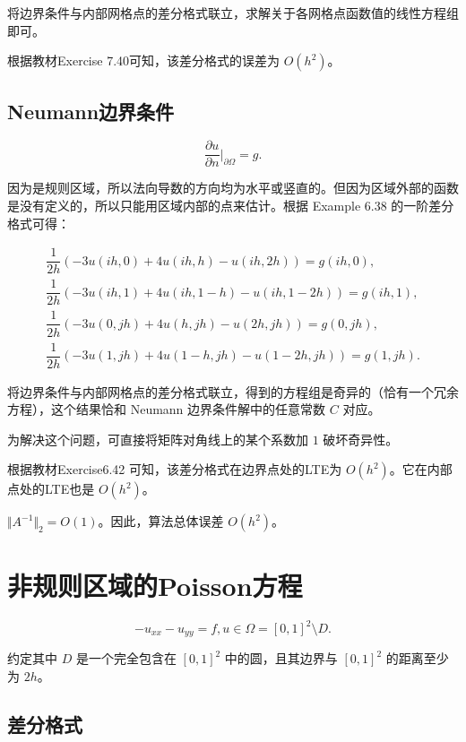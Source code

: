 \documentclass{ctexart}
\begin{document}
将边界条件与内部网格点的差分格式联立，求解关于各网格点函数值的线性方程组即可。

根据教材Exercise 7.40可知，该差分格式的误差为 $O(h^2)$。

\subsection{Neumann边界条件}

\begin{equation}
    \dfrac{\partial u}{\partial n}|_{\partial \Omega} = g.
\end{equation}

因为是规则区域，所以法向导数的方向均为水平或竖直的。但因为区域外部的函数是没有定义的，所以只能用区域内部的点来估计。根据 Example 6.38 的一阶差分格式可得：

\begin{align}
    \dfrac 1{2h}(-3u(ih,0)+4u(ih,h)-u(ih,2h)) = g(ih,0),\\
    \dfrac 1{2h}(-3u(ih,1)+4u(ih,1-h)-u(ih,1-2h)) = g(ih,1),\\
    \dfrac 1{2h}(-3u(0,jh)+4u(h,jh)-u(2h,jh)) = g(0,jh),\\
    \dfrac 1{2h}(-3u(1,jh)+4u(1-h,jh)-u(1-2h,jh)) = g(1,jh).
\end{align}

将边界条件与内部网格点的差分格式联立，得到的方程组是奇异的（恰有一个冗余方程），这个结果恰和 Neumann 边界条件解中的任意常数 $C$ 对应。

为解决这个问题，可直接将矩阵对角线上的某个系数加 $1$ 破坏奇异性。

根据教材Exercise6.42 可知，该差分格式在边界点处的LTE为 $O(h^2)$。它在内部点处的LTE也是 $O(h^2)$。

$\Vert A^{-1}\Vert_2=O(1)$。因此，算法总体误差 $O(h^2)$。

\section{非规则区域的Poisson方程}

\begin{equation}
    -u_{xx}-u_{yy} = f,u\in \Omega=[0,1]^2\setminus D.
\end{equation}

约定其中 $D$ 是一个完全包含在 $[0,1]^2$ 中的圆，且其边界与 $[0,1]^2$ 的距离至少为 $2h$。

\subsection{差分格式}
\end{document}
